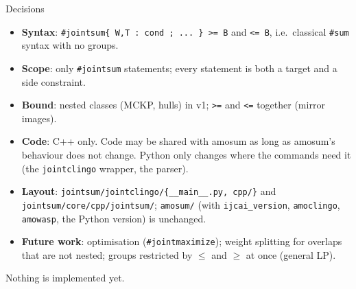 \documentclass[aspectratio=169,11pt]{beamer}
\newcommand{\file}[1]{{\small\texttt{\color{acc}#1}}}
\begin{document}
\begin{frame}{Decisions}
\footnotesize
\begin{itemize}\setlength\itemsep{3pt}
\item \textbf{Syntax}: \texttt{\#jointsum\{ W,T : cond ; ... \} >= B} and \texttt{<= B}, i.e.\ classical \texttt{\#sum} syntax with no groups.
\item \textbf{Scope}: only \texttt{\#jointsum} statements; every statement is both a target and a side constraint.
\item \textbf{Bound}: nested classes (MCKP, hulls) in v1; \texttt{>=} and \texttt{<=} together (mirror images).
\item \textbf{Code}: C++ only. Code may be shared with amosum as long as amosum's behaviour does not change. Python only
  changes where the commands need it (the \texttt{jointclingo} wrapper, the parser).
\item \textbf{Layout}: \file{jointsum/jointclingo/\{\_\_main\_\_.py, cpp/\}} and \file{jointsum/core/cpp/jointsum/}; \file{amosum/}
  (with \texttt{ijcai\_version}, \texttt{amoclingo}, \texttt{amowasp}, the Python version) is unchanged.
\item \textbf{Future work}: optimisation (\texttt{\#jointmaximize}); weight splitting for overlaps that are not nested;
  groups restricted by $\le$ and $\ge$ at once (general LP).
\end{itemize}
\vspace{2mm}
\centering\textcolor{new}{Nothing is implemented yet.}
\end{frame}
\end{document}
